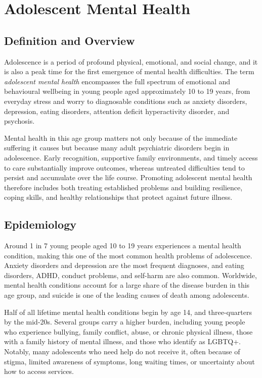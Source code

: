 \chapter{Adolescent Mental Health}

\section*{Definition and Overview}
Adolescence is a period of profound physical, emotional, and social change, and it is also a peak time for the first emergence of mental health difficulties. The term \textit{adolescent mental health} encompasses the full spectrum of emotional and behavioural wellbeing in young people aged approximately 10 to 19 years, from everyday stress and worry to diagnosable conditions such as anxiety disorders, depression, eating disorders, attention deficit hyperactivity disorder, and psychosis.

Mental health in this age group matters not only because of the immediate suffering it causes but because many adult psychiatric disorders begin in adolescence. Early recognition, supportive family environments, and timely access to care substantially improve outcomes, whereas untreated difficulties tend to persist and accumulate over the life course. Promoting adolescent mental health therefore includes both treating established problems and building resilience, coping skills, and healthy relationships that protect against future illness.

\section*{Epidemiology}
Around 1 in 7 young people aged 10 to 19 years experiences a mental health condition, making this one of the most common health problems of adolescence. Anxiety disorders and depression are the most frequent diagnoses, and eating disorders, ADHD, conduct problems, and self-harm are also common. Worldwide, mental health conditions account for a large share of the disease burden in this age group, and suicide is one of the leading causes of death among adolescents.

Half of all lifetime mental health conditions begin by age 14, and three-quarters by the mid-20s. Several groups carry a higher burden, including young people who experience bullying, family conflict, abuse, or chronic physical illness, those with a family history of mental illness, and those who identify as LGBTQ+. Notably, many adolescents who need help do not receive it, often because of stigma, limited awareness of symptoms, long waiting times, or uncertainty about how to access services.

